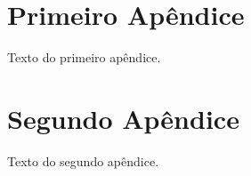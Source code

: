 \begin{apendicesenv}

\partapendices




\chapter{Primeiro Apêndice}

Texto do primeiro apêndice.

\chapter{Segundo Apêndice}

Texto do segundo apêndice.

\end{apendicesenv}

